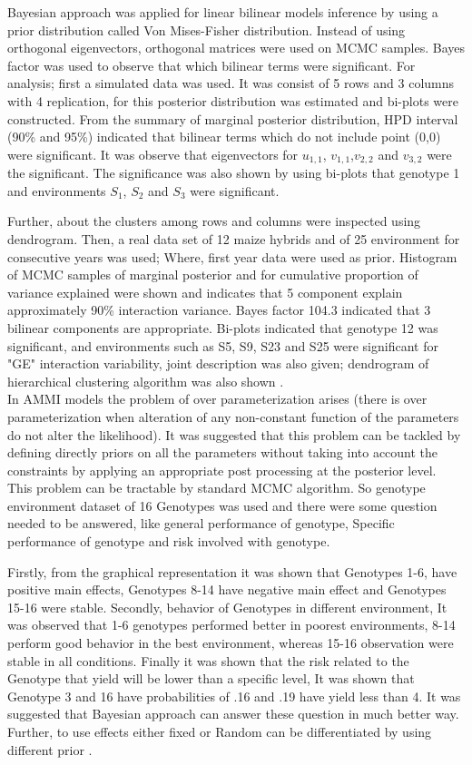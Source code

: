   Bayesian approach was applied for linear bilinear models inference by using a prior distribution called Von Mises-Fisher distribution. Instead of using orthogonal eigenvectors, orthogonal matrices were used on MCMC samples. Bayes factor was used to observe that which bilinear terms were significant. For analysis; first a simulated data was used. It was consist of 5 rows and 3 columns with 4 replication, for this posterior distribution was estimated and bi-plots were constructed. From the summary of marginal posterior distribution, HPD interval (90\% and 95\%) indicated that bilinear terms which do not include point (0,0) were significant. It was observe that eigenvectors for $u_{1,1}$, $v_{1,1}$,$ v_{2,2}$ and $v_{3,2}$ were the significant. The significance was also shown by using bi-plots that genotype 1 and environments $S_1$, $S_2$ and $S_3$ were significant. 
  
  Further, about the clusters among rows and columns were inspected using dendrogram. Then, a real data set of 12 maize hybrids and of 25 environment for consecutive years was used; Where, first year data were used as prior. Histogram of MCMC samples of marginal posterior and for cumulative proportion of variance explained were shown and indicates that 5 component explain approximately 90\% interaction variance. Bayes factor 104.3 indicated that 3 bilinear components are appropriate. Bi-plots indicated that genotype 12 was significant, and environments such as S5, S9, S23 and S25 were significant for "GE" interaction variability, joint description was also given; dendrogram of hierarchical clustering algorithm was also shown \citep{PEREZ-ELIZALDE2011}.\\
 
 In AMMI models the problem of over parameterization arises (there is over parameterization when alteration of any non-constant function of the parameters do not alter the likelihood). It was suggested that this problem can be tackled by defining directly priors on all the parameters without taking into account the constraints by applying an appropriate post processing at the posterior level. This problem can be tractable by standard MCMC algorithm. So genotype environment dataset of 16 Genotypes was used and there were some question needed to be answered, like general performance of genotype, Specific performance of genotype and risk involved with genotype.
 
  Firstly, from the graphical representation it was shown that Genotypes 1-6, have  positive main effects, Genotypes 8-14 have negative main effect and Genotypes 15-16 were stable. Secondly, behavior of Genotypes in different environment, It was observed that 1-6 genotypes performed better in poorest environments, 8-14 perform good behavior in the best environment, whereas 15-16 observation were stable in all conditions. Finally it was shown that the risk related to the Genotype that yield will be lower than a specific level, It was shown that Genotype 3 and 16 have probabilities of .16 and .19 have yield less than 4. It was suggested that Bayesian approach can answer these question in much better way. Further, to use effects either fixed or Random can be differentiated by using different prior \citep{JOSSE2014}.